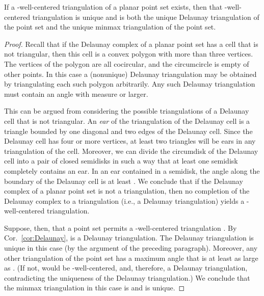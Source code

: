 \documentclass[final]{siamltex}
\begin{document}
\begin{theorem}
\label{thm:uniquewct}
If a -well-centered triangulation of a planar point set exists,
then that -well-centered triangulation is unique and is both the
unique Delaunay triangulation of the point set and the unique minmax
triangulation of the point set.
\end{theorem}
\begin{proof}
Recall that if the Delaunay complex of a planar point set has a cell
  that is not triangular, then this cell is a convex polygon with more
  than three vertices.  The vertices of the polygon are all
  cocircular, and the circumcircle is empty of other points.  In this
  case a (nonunique) Delaunay triangulation may be obtained by
  triangulating each such polygon arbitrarily.  Any such Delaunay
  triangulation must contain an angle with measure  or larger.

  This can be argued from considering the possible triangulations of a
  Delaunay cell that is not triangular.
An {\emph{ear}} of the triangulation of the Delaunay cell is a
  triangle bounded by one diagonal and two edges of the Delaunay cell.
  Since the Delaunay cell has four or more
  vertices, 
at least two triangles will be ears in any triangulation of the
  cell.  Moreover, we can divide the circumdisk of the Delaunay cell
  into a pair of
closed semidisks in such a way that at least one semidisk completely
  contains an ear.  In an ear contained in a semidisk, the angle along the boundary of
  the Delaunay cell is at least .  We conclude that if the
  Delaunay complex of a planar point set is not a triangulation, then
  no completion of the Delaunay complex to a triangulation (i.e., a
  Delaunay triangulation) yields a -well-centered triangulation.



Suppose, then, that a point set permits a -well-centered
triangulation .  By Cor.~\ref{cor:Delaunay}, 
is a Delaunay triangulation.  The Delaunay triangulation is unique in
this case (by the argument of the preceding paragraph).  Moreover, any
other triangulation  of the point set has a maximum angle that
is at least as large as .  (If not,  would be
-well-centered, and, therefore, a Delaunay triangulation,
contradicting the uniqueness of the Delaunay triangulation.)  We
conclude that the minmax triangulation in this case is 
and is unique.
\end{proof}

\bigskip
\end{document}
